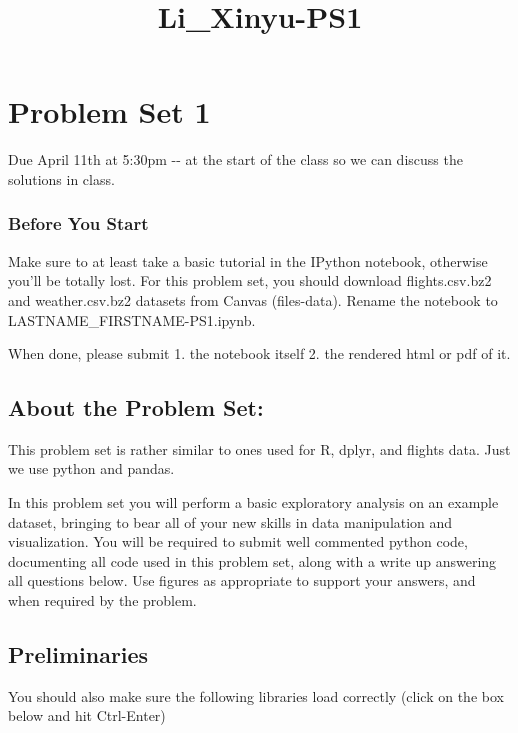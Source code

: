 \documentclass[11pt]{article}
\title{Li\_Xinyu-PS1}
\begin{document}
    
    
    \maketitle
    
    

    
    \section{Problem Set 1}\label{problem-set-1}

Due April 11th at 5:30pm -\/- at the start of the class so we can
discuss the solutions in class.

\subsubsection{Before You Start}\label{before-you-start}

Make sure to at least take a basic tutorial in the IPython notebook,
otherwise you'll be totally lost. For this problem set, you should
download flights.csv.bz2 and weather.csv.bz2 datasets from Canvas
(files-data). Rename the notebook to LASTNAME\_FIRSTNAME-PS1.ipynb.

When done, please submit 1. the notebook itself 2. the rendered html or
pdf of it.

    \subsection{About the Problem Set:}\label{about-the-problem-set}

This problem set is rather similar to ones used for R, dplyr, and
flights data. Just we use python and pandas.

In this problem set you will perform a basic exploratory analysis on an
example dataset, bringing to bear all of your new skills in data
manipulation and visualization. You will be required to submit well
commented python code, documenting all code used in this problem set,
along with a write up answering all questions below. Use figures as
appropriate to support your answers, and when required by the problem.

    \subsection{Preliminaries}\label{preliminaries}

You should also make sure the following libraries load correctly (click
on the box below and hit Ctrl-Enter)
\end{document}
